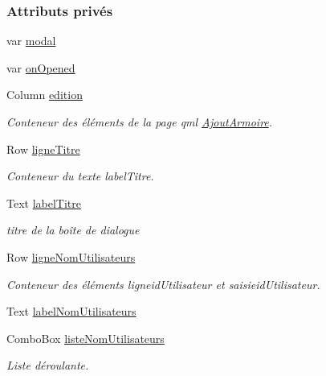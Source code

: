\subsubsection*{Attributs privés}
\begin{DoxyCompactItemize}
\item 
var \hyperlink{class_modification_utilisateur_aa3f545080ca7bedac933df07dbe02b2e}{modal}
\item 
var \hyperlink{class_modification_utilisateur_ac23956636fea53b81ec22904a5b82d41}{on\+Opened}
\item 
Column \hyperlink{class_modification_utilisateur_ab1475807d2fb90c9620686a3eabdff2d}{edition}
\begin{DoxyCompactList}\small\item\em Conteneur des éléments de la page qml \hyperlink{class_ajout_armoire}{Ajout\+Armoire}. \end{DoxyCompactList}\item 
Row \hyperlink{class_modification_utilisateur_a9ea16e1e90f3893c9f12c09128c98cfa}{ligne\+Titre}
\begin{DoxyCompactList}\small\item\em Conteneur du texte label\+Titre. \end{DoxyCompactList}\item 
Text \hyperlink{class_modification_utilisateur_a6b783e48d759bb9d85f86c0830b33487}{label\+Titre}
\begin{DoxyCompactList}\small\item\em titre de la boîte de dialogue \end{DoxyCompactList}\item 
Row \hyperlink{class_modification_utilisateur_a1ca9c95268949139622261d029df3544}{ligne\+Nom\+Utilisateurs}
\begin{DoxyCompactList}\small\item\em Conteneur des éléments ligneid\+Utilisateur et saisieid\+Utilisateur. \end{DoxyCompactList}\item 
Text \hyperlink{class_modification_utilisateur_a262ca8509d8fe7bb7ead246b43dab9d3}{label\+Nom\+Utilisateurs}
\item 
Combo\+Box \hyperlink{class_modification_utilisateur_a0d6542fd62998ff7b7a597e3b0da3e37}{liste\+Nom\+Utilisateurs}
\begin{DoxyCompactList}\small\item\em Liste déroulante. \end{DoxyCompactList}\item 

\end{DoxyCompactItemize}
